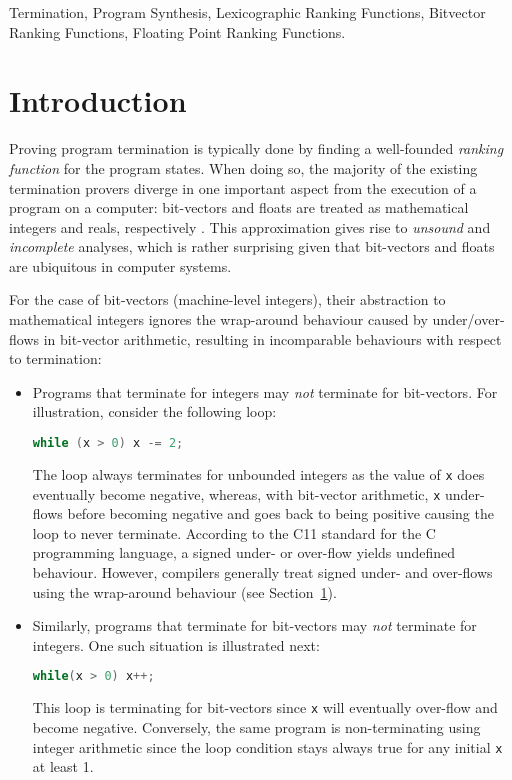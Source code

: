 \documentclass[preprint]{sigplanconf}
\theoremstyle{definition}
\begin{document}
\keywords
Termination, Program Synthesis, Lexicographic Ranking Functions, Bitvector Ranking Functions,
Floating Point Ranking Functions.

\section{Introduction}

Proving program termination is typically done by finding a well-founded \emph{ranking function}
for the program states. When doing so, the majority of the existing termination provers diverge 
in one important aspect from the execution
of a program on a computer:
bit-vectors and floats 
are treated as mathematical integers and reals, respectively \cite{}.
This approximation gives rise to 
{\em unsound} and {\em incomplete} analyses, which is rather surprising given that bit-vectors and floats are ubiquitous in computer systems. 



For the case of bit-vectors (machine-level integers), their abstraction  to mathematical integers 
ignores the wrap-around behaviour caused by under/over-flows in bit-vector arithmetic, resulting in %
incomparable behaviours with respect to termination:
\begin{itemize}
\item Programs that terminate for integers may \emph{not} terminate for bit-vectors. For illustration, consider the following loop:
\begin{lstlisting}[language=C]
while (x > 0) x -= 2;
\end{lstlisting}
The loop always terminates for unbounded integers as the value of \texttt{x} does eventually become negative, 
whereas, with bit-vector arithmetic, \texttt{x} under-flows before becoming negative and goes back to being positive causing the loop to never terminate.
According to the C11 standard for the C programming language, a signed under- or over-flow yields undefined behaviour.
However, compilers generally treat signed under- and over-flows using the
wrap-around behaviour (see Section~\ref{}). 
\item Similarly, programs that terminate for bit-vectors may \emph{not} terminate for integers. One such situation is illustrated next:  
 \begin{lstlisting}[language=C]
 while(x > 0) x++;
 \end{lstlisting}
This loop is  terminating for bit-vectors since \texttt{x}
will eventually over-flow and become negative. Conversely, the same program is non-terminating using integer
arithmetic since the loop condition stays always true for any initial \texttt{x} at least 1.
\end{itemize}
\end{document}
